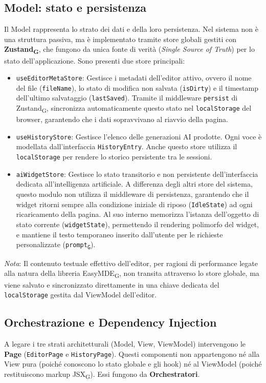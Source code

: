 \documentclass[11pt,a4paper]{article}
\newcommand{\gls}[1]{#1\textsubscript{G}}
\begin{document}
\newpage
\subsection{Model: stato e persistenza}
Il Model rappresenta lo strato dei dati e della loro persistenza. Nel sistema non è una struttura passiva, ma è implementato tramite store globali gestiti con \textbf{\gls{Zustand}}, che fungono da unica fonte di verità (\textit{Single Source of Truth}) per lo stato dell'applicazione.
Sono presenti due store principali:
\begin{itemize}
    \item \texttt{useEditorMetaStore}: Gestisce i metadati dell'editor attivo, ovvero il nome del file (\texttt{fileName}), lo stato di modifica non salvata (\texttt{isDirty}) e il timestamp dell'ultimo salvataggio (\texttt{lastSaved}). Tramite il middleware \texttt{persist} di \gls{Zustand}, sincronizza automaticamente questo stato nel \texttt{localStorage} del browser, garantendo che i dati sopravvivano al riavvio della pagina.
    \item \texttt{useHistoryStore}: Gestisce l'elenco delle generazioni AI prodotte. Ogni voce è modellata dall'interfaccia \texttt{HistoryEntry}. Anche questo store utilizza il \texttt{localStorage} per rendere lo storico persistente tra le sessioni.
    \item \texttt{aiWidgetStore}: Gestisce lo stato transitorio e non persistente dell'interfaccia dedicata all'intelligenza artificiale. A differenza degli altri store del sistema, questo modulo non utilizza il middleware di persistenza, garantendo che il widget ritorni sempre alla condizione iniziale di riposo (\texttt{IdleState}) ad ogni ricaricamento della pagina. Al suo interno memorizza l'istanza dell'oggetto di stato corrente (\texttt{widgetState}), permettendo il rendering polimorfo del widget, e mantiene il testo temporaneo inserito dall'utente per le richieste personalizzate (\texttt{\gls{prompt}}).
\end{itemize}

\textit{Nota}: Il contenuto testuale effettivo dell'editor, per ragioni di performance legate alla natura della libreria \gls{EasyMDE}, non transita attraverso lo store globale, ma viene salvato e sincronizzato direttamente in una chiave dedicata del \texttt{localStorage} gestita dal ViewModel dell'editor.


\newpage

\subsection{Orchestrazione e Dependency Injection}
A legare i tre strati architetturali (Model, View, ViewModel) intervengono le \textbf{Page} (\texttt{EditorPage} e \texttt{HistoryPage}). Questi componenti non appartengono né alla View pura (poiché conoscono lo stato globale e gli hook) né al ViewModel (poiché restituiscono markup \gls{JSX}). Essi fungono da \textbf{Orchestratori}.
\end{document}
